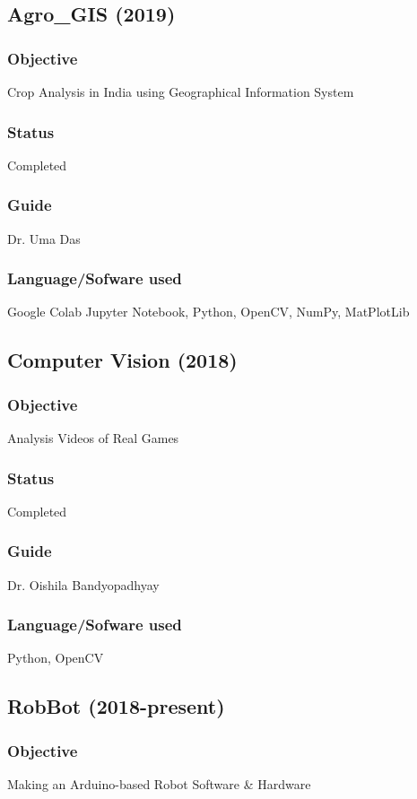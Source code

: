 \documentclass{article}
\begin{document}
\subsection{Agro\_GIS (2019)}
\subsubsection{Objective} Crop Analysis in India using Geographical Information System
\subsubsection{Status} Completed
\subsubsection{Guide} Dr. Uma Das
\subsubsection{Language/Sofware used} Google Colab Jupyter Notebook, Python, OpenCV, NumPy, MatPlotLib

\subsection{Computer Vision (2018)}
\subsubsection{Objective} Analysis Videos of Real Games
\subsubsection{Status} Completed
\subsubsection{Guide} Dr. Oishila Bandyopadhyay
\subsubsection{Language/Sofware used} Python, OpenCV

\subsection{RobBot (2018-present)}
\subsubsection{Objective} Making an Arduino-based Robot Software \& Hardware
\end{document}
